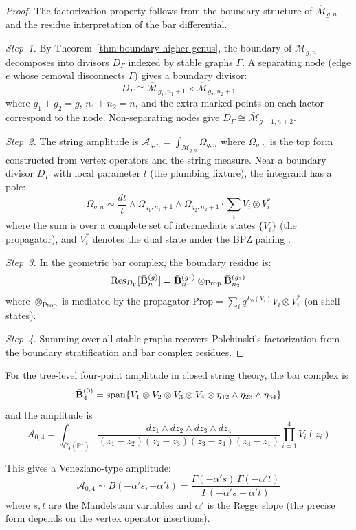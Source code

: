 \begin{proof}
The factorization property follows from the boundary structure of $\overline{\mathcal{M}}_{g,n}$ and the residue interpretation of the bar differential.

\emph{Step~1.}
By Theorem~\ref{thm:boundary-higher-genus}, the boundary of $\overline{\mathcal{M}}_{g,n}$ decomposes into divisors $D_\Gamma$ indexed by stable graphs $\Gamma$.  A separating node (edge $e$ whose removal disconnects $\Gamma$) gives a boundary divisor:
\[
D_\Gamma \cong \overline{\mathcal{M}}_{g_1, n_1+1} \times \overline{\mathcal{M}}_{g_2, n_2+1}
\]
where $g_1 + g_2 = g$, $n_1 + n_2 = n$, and the extra marked points on each factor correspond to the node.  Non-separating nodes give $D_\Gamma \cong \overline{\mathcal{M}}_{g-1, n+2}$.

\emph{Step~2.}
The string amplitude is $\mathcal{A}_{g,n} = \int_{\overline{\mathcal{M}}_{g,n}} \Omega_{g,n}$ where $\Omega_{g,n}$ is the top form constructed from vertex operators and the string measure.  Near a boundary divisor $D_\Gamma$ with local parameter $t$ (the plumbing fixture), the integrand has a pole:
\[
\Omega_{g,n} \sim \frac{dt}{t} \wedge \Omega_{g_1, n_1+1} \wedge \Omega_{g_2, n_2+1} \cdot \sum_i V_i \otimes V_i^*
\]
where the sum is over a complete set of intermediate states $\{V_i\}$ (the propagator), and $V_i^*$ denotes the dual state under the BPZ pairing \cite{BPZ84}.

\emph{Step~3.}
In the geometric bar complex, the boundary residue is:
\[
\operatorname{Res}_{D_\Gamma}[\bar{\mathbf{B}}^{(g)}_n] = \bar{\mathbf{B}}^{(g_1)}_{n_1} \otimes_{\mathrm{Prop}} \bar{\mathbf{B}}^{(g_2)}_{n_2}
\]
where $\otimes_{\mathrm{Prop}}$ is mediated by the propagator $\mathrm{Prop} = \sum_i q^{L_0(V_i)} V_i \otimes V_i^*$ (on-shell states).

\emph{Step~4.}
Summing over all stable graphs recovers Polchinski's factorization \cite{Pol98} from the boundary stratification and bar complex residues.
\end{proof}

\begin{example}
For the tree-level four-point amplitude in closed string theory, the bar complex is
\[\bar{\mathbf{B}}^{(0)}_4 = \text{span}\{V_1 \otimes V_2 \otimes V_3 \otimes V_4 \otimes \eta_{12} \wedge \eta_{23} \wedge \eta_{34}\}\]
and the amplitude is
\[\mathcal{A}_{0,4} = \int_{\overline{C}_4(\mathbb{P}^1)} \frac{dz_1 \wedge dz_2 \wedge dz_3 \wedge dz_4}{(z_1-z_2)(z_2-z_3)(z_3-z_4)(z_4-z_1)} \prod_{i=1}^4 V_i(z_i)\]

This gives a Veneziano-type amplitude:
\[\mathcal{A}_{0,4} \sim B(-\alpha' s, -\alpha' t) = \frac{\Gamma(-\alpha' s)\,\Gamma(-\alpha' t)}{\Gamma(-\alpha' s - \alpha' t)}\]
where $s, t$ are the Mandelstam variables and $\alpha'$ is the Regge slope (the precise form depends on the vertex operator insertions).
\end{example}

